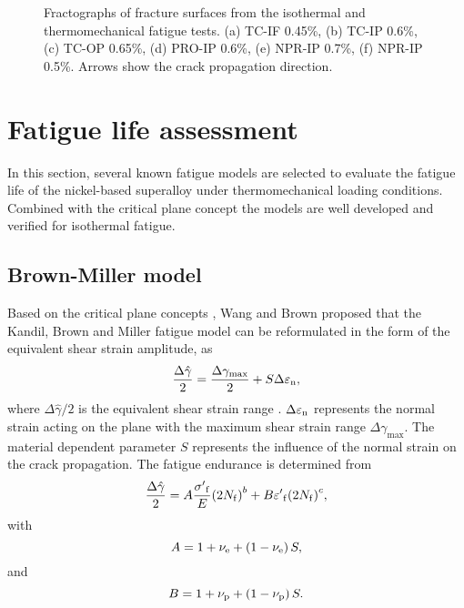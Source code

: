 \begin{figure*}
  \caption{Fractographs of fracture surfaces from the isothermal and thermomechanical fatigue tests. (a) TC-IF 0.45\%, (b) TC-IP 0.6\%, (c) TC-OP 0.65\%, (d) PRO-IP 0.6\%, (e) NPR-IP 0.7\%, (f) NPR-IP 0.5\%. Arrows show the crack propagation direction.}
  \label{Fig:crack_propagation}
\end{figure*}

\section{Fatigue life assessment}
\noindent
In this section, several known fatigue models are selected to evaluate the fatigue life of the nickel-based superalloy under thermomechanical loading conditions. Combined with the critical plane concept the models are well developed and verified for isothermal fatigue.

\subsection{Brown-Miller model}
\noindent
Based on the critical plane concepts \cite{Brown2006}, Wang and Brown \cite{Wang1993} proposed that the Kandil, Brown and Miller fatigue model \cite{Kandil1982} can be reformulated in the form of the equivalent shear strain amplitude, as
\begin{equation}
\frac{{\Delta \hat \gamma }}{2} = \frac{{\Delta {\gamma _{\max}}}}{2} + S\Delta {\varepsilon _{\rm n}},
\label{Equ:ShearStrainBM}
\end{equation}
where ${{\Delta \hat \gamma }}/{2}$ is the equivalent shear strain range \cite{Wang1993}. $\Delta {\varepsilon _{\rm n}}$ represents the normal strain acting on the plane with the maximum shear strain range $\Delta {\gamma _{\max}}$. The material dependent parameter $S$ represents the influence of the normal strain on the crack propagation.
The fatigue endurance is determined from
\begin{equation}
\frac{{\Delta \hat \gamma }}{2} = A\frac{{{{\sigma '}_{\rm f}}}}{E}{\left( {2{N_{\rm f}}} \right)^b} + B{{\varepsilon '}_{\rm f}}{\left( {2{N_{\rm f}}} \right)^c},
\label{Equ:BM_model}
\end{equation}
with
\[A = 1 + {\nu _{\rm e}} + \left( {1 - {\nu _{\rm e}}} \right)S,\]
and
\[B = 1 + {\nu _{\rm p}} + \left( {1 - {\nu _{\rm p}}} \right)S.\]

